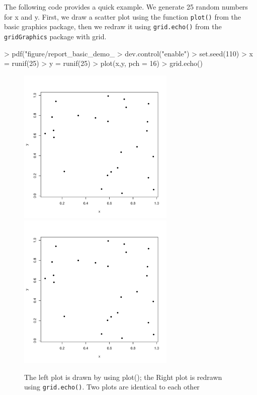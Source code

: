 \documentclass[paper=a4, fontsize=11pt]{report}
\begin{document}
The following code provides a quick example. We generate 25 random numbers for x and y. First, we draw a scatter plot using the function \texttt{plot()} from the basic graphics package, then we redraw it using \texttt{grid.echo()} from the \texttt{gridGraphics} package with grid.
\begin{Schunk}
\begin{Sinput}
> pdf("figure/report_basic_demo_%
> dev.control("enable")
> set.seed(110)
> x = runif(25)
> y = runif(25)
> plot(x,y, pch = 16)
> grid.echo()
\end{Sinput}
\end{Schunk}
\newpage
\begin{figure}[h]
\begin{center}
  \includegraphics[height = 7.5cm, width = 7.5cm]{figure/report_basic_demo_1.pdf}
  \includegraphics[height = 7.5cm, width = 7.5cm]{figure/report_basic_demo_1.pdf}
  \caption{The left plot is drawn by using plot(); the Right plot is redrawn using \texttt{grid.echo()}. Two plots are identical to each other}
  	\label{figure1}
\end{center}
\end{figure}
\end{document}
